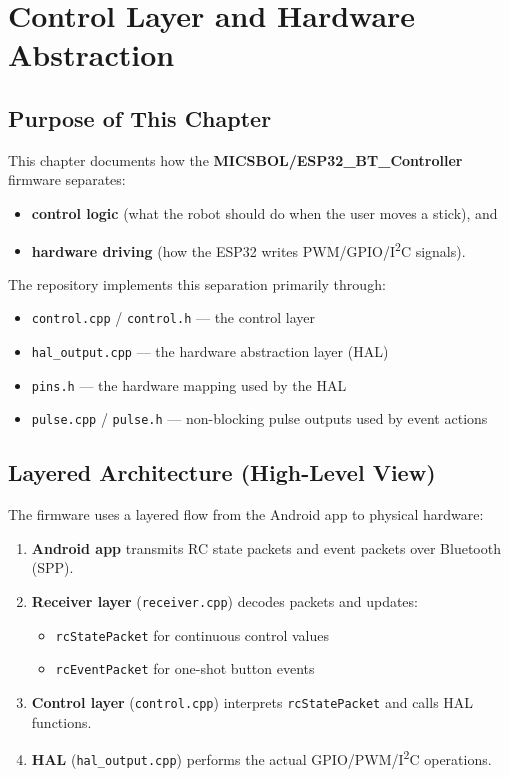 \chapter{Control Layer and Hardware Abstraction}
\label{ch:control-hal}

\section{Purpose of This Chapter}
\label{sec:control-hal-purpose}

This chapter documents how the \textbf{MICSBOL/ESP32\_BT\_Controller} firmware separates:

\begin{itemize}
    \item \textbf{control logic} (what the robot should do when the user moves a stick), and
    \item \textbf{hardware driving} (how the ESP32 writes PWM/GPIO/I\textsuperscript{2}C signals).
\end{itemize}

The repository implements this separation primarily through:

\begin{itemize}
    \item \texttt{control.cpp} / \texttt{control.h} --- the control layer
    \item \texttt{hal\_output.cpp} --- the hardware abstraction layer (HAL)
    \item \texttt{pins.h} --- the hardware mapping used by the HAL
    \item \texttt{pulse.cpp} / \texttt{pulse.h} --- non-blocking pulse outputs used by event actions
\end{itemize}

\section{Layered Architecture (High-Level View)}
\label{sec:control-hal-architecture}

The firmware uses a layered flow from the Android app to physical hardware:

\begin{enumerate}
    \item \textbf{Android app} transmits RC state packets and event packets over Bluetooth (SPP).
    \item \textbf{Receiver layer} (\texttt{receiver.cpp}) decodes packets and updates:
    \begin{itemize}
        \item \texttt{rcStatePacket} for continuous control values
        \item \texttt{rcEventPacket} for one-shot button events
    \end{itemize}
    \item \textbf{Control layer} (\texttt{control.cpp}) interprets \texttt{rcStatePacket} and calls HAL functions.
    \item \textbf{HAL} (\texttt{hal\_output.cpp}) performs the actual GPIO/PWM/I\textsuperscript{2}C operations.
\end{enumerate}

